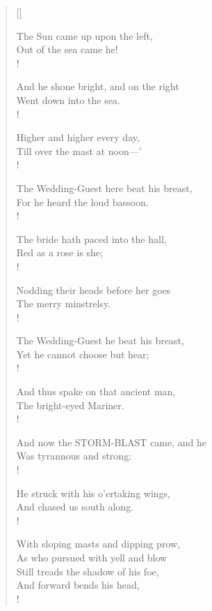 \documentclass[12pt]{article}
\begin{document}
\begin{verse}[\linewidth]
\clearpage

\vspace*{1in}

The Sun came up upon the left, \\
Out of the sea came he! \\!

And he shone bright, and on the right \\
Went down into the sea. \\!

\bigskip

Higher and higher every day, \\
Till over the mast at noon—' \\!

The Wedding-Guest here beat his breast, \\
For he heard the loud bassoon. \\!

\bigskip

The bride hath paced into the hall, \\
Red as a rose is she; \\!

Nodding their heads before her goes \\
The merry minstrelsy. \\!

\bigskip

The Wedding-Guest he beat his breast, \\
Yet he cannot choose but hear; \\!

And thus spake on that ancient man, \\
The bright-eyed Mariner. \\!

\bigskip
\bigskip

And now the STORM-BLAST came, and he \\
Was tyrannous and strong: \\!

He struck with his o'ertaking wings, \\
And chased us south along. \\!

\clearpage

\vspace*{1in}

With sloping masts and dipping prow, \\
As who pursued with yell and blow \\
Still treads the shadow of his foe, \\
And forward bends his head, \\!


\end{verse}
\end{document}
